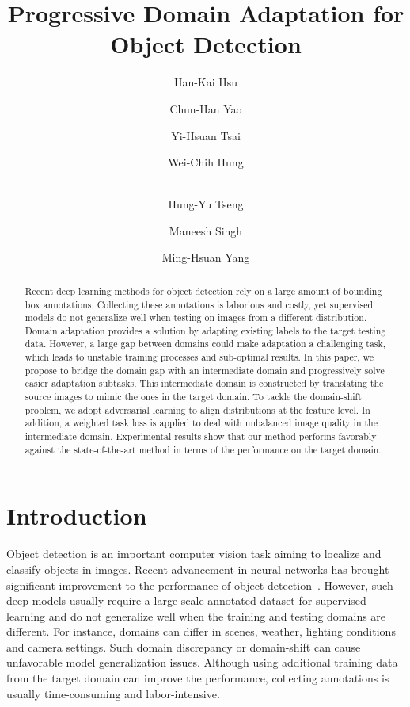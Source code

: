 \documentclass[10pt,twocolumn,letterpaper]{article}
\begin{document}
\title{Progressive Domain Adaptation for Object Detection}



\makeatletter
\renewcommand\AB@affilsepx{\hspace{1mm} \protect\Affilfont}
\makeatother

\author[1]{Han-Kai Hsu}
\author[1]{Chun-Han Yao}
\author[2]{Yi-Hsuan Tsai}
\author[1]{Wei-Chih Hung}
\author[1]{\\Hung-Yu Tseng}
\author[3]{Maneesh Singh}
\author[1,4]{Ming-Hsuan Yang}

\maketitle
\ifwacvfinal\thispagestyle{empty}\fi
\begin{abstract}
Recent deep learning methods for object detection rely on a large amount of bounding box annotations.
Collecting these annotations is laborious and costly, yet supervised models do not generalize well when testing on images from a different distribution.
Domain adaptation provides a solution by adapting existing labels to the target testing data.
However, a large gap between domains could make adaptation a challenging task, which leads to unstable training processes and sub-optimal results.
In this paper, we propose to bridge the domain gap with an intermediate domain and progressively solve easier adaptation subtasks.
This intermediate domain is constructed by translating the source images to mimic the ones in the target domain.
To tackle the domain-shift problem, we adopt adversarial learning to align distributions at the feature level.
In addition, a weighted task loss is applied to deal with unbalanced image quality in the intermediate domain.
Experimental results show that our method performs favorably against the state-of-the-art method in terms of the performance on the target domain.
\end{abstract}

\vspace{-6mm}\section{Introduction}

Object detection is an important computer vision task aiming to localize and classify objects in images.
Recent advancement in neural networks has brought significant improvement to the performance of object detection~\cite{girshick2015fast, Ren_2017, Redmon_2016, Redmon_2017, Redmon2018YOLOv3AI, liu2016ssd}.
However, such deep models usually require a large-scale annotated dataset for supervised learning and do not generalize well when the training and testing domains are different.
For instance, domains can differ in scenes, weather, lighting conditions and camera settings.
Such domain discrepancy or domain-shift can cause unfavorable model generalization issues.
Although using additional training data from the target domain can improve the performance, collecting annotations is usually time-consuming and labor-intensive.
\end{document}
